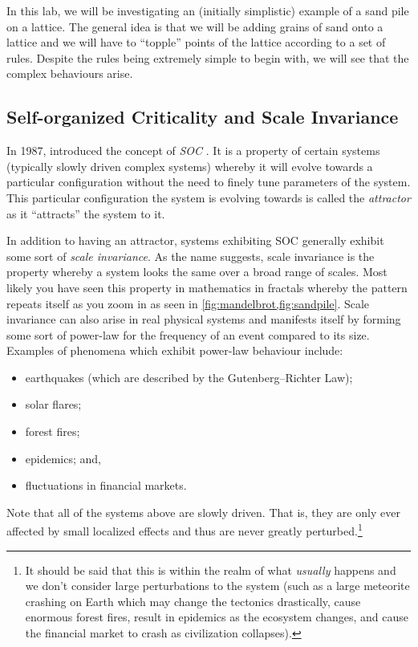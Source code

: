 \documentclass[
  a4paper,             %
  11pt,                %
  oneside,             %
  onecolumn,           %
  bibliography=totoc,  %
  final,               %
]{scrartcl}
\begin{document}
In this lab, we will be investigating an (initially simplistic) example of a
sand pile on a lattice.  The general idea is that we will be adding grains of
sand onto a lattice and we will have to \enquote{topple} points of the lattice
according to a set of rules.  Despite the rules being extremely simple to begin
with, we will see that the complex behaviours arise.

\subsection{Self-organized Criticality and Scale Invariance}
\label{subsec:soc_and_scale_invariance}

In 1987, \citeauthor{PhysRevLett.59.381} introduced the concept of
\emph{\gls{SOC}} \cite{PhysRevLett.59.381,PhysRevA.38.364}.  It is a property of
certain systems (typically slowly driven complex systems) whereby it will evolve
towards a particular configuration without the need to finely tune parameters of
the system.  This particular configuration the system is evolving towards is
called the \emph{attractor} as it \enquote{attracts} the system to it.

In addition to having an attractor, systems exhibiting \gls{SOC} generally
exhibit some sort of \emph{scale invariance}.  As the name suggests, scale
invariance is the property whereby a system looks the same over a broad range of
scales.  Most likely you have seen this property in mathematics in fractals
whereby the pattern repeats itself as you zoom in as seen in
\cref{fig:mandelbrot,fig:sandpile}.  Scale invariance can also arise in real
physical systems and manifests itself by forming some sort of power-law for the
frequency of an event compared to its size.  Examples of phenomena which exhibit
power-law behaviour include:
\begin{itemize}
  \item earthquakes (which are described by the Gutenberg--Richter Law);
  \item solar flares;
  \item forest fires;
  \item epidemics; and,
  \item fluctuations in financial markets.
\end{itemize}
Note that all of the systems above are slowly driven.  That is, they are only
ever affected by small localized effects and thus are never greatly
perturbed.\footnote{It should be said that this is within the realm of what
  \emph{usually} happens and we don't consider large perturbations to the system
  (such as a large meteorite crashing on Earth which may change the tectonics
  drastically, cause enormous forest fires, result in epidemics as the ecosystem
  changes, and cause the financial market to crash as civilization collapses).}
\end{document}
